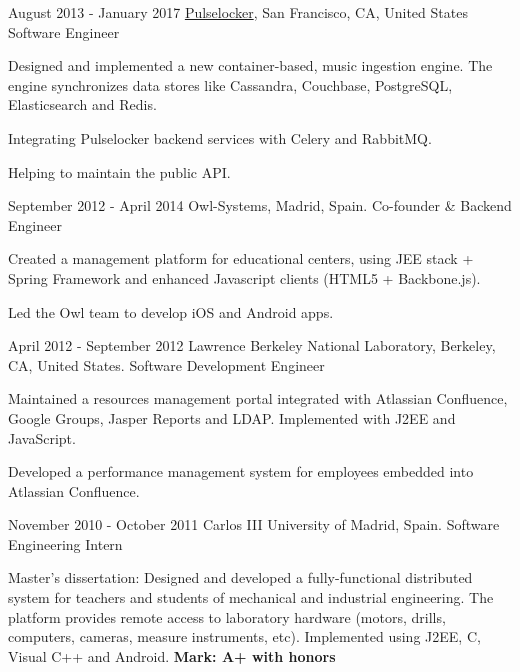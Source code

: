 \experience
  {August 2013 - January 2017}
  {\href{https://djtechtools.com/2018/04/04/beatport-acquires-pulselocker-relaunching-subscription-service-in-q3-2018/}{Pulselocker}, San Francisco, CA, United States}
  {Software Engineer}
  {\vspace{-1em}\begin{rlist}
    \item Designed and implemented a new container-based, music ingestion engine. The engine
    synchronizes data stores like Cassandra, Couchbase, PostgreSQL, Elasticsearch and Redis.
    \item Integrating Pulselocker backend services with Celery and RabbitMQ.
    \item Helping to maintain the public API.
  \end{rlist}}

\experience
  {September 2012 - April 2014}
  {Owl-Systems, Madrid, Spain.}
  {Co-founder \& Backend Engineer}
  {\vspace{-1em}\begin{rlist}
    \item Created a management platform for educational centers, using JEE stack + Spring
    Framework and enhanced Javascript clients (HTML5 + Backbone.js).
    \item Led the Owl team to develop iOS and Android apps.
  \end{rlist}}

\experience
  {April 2012 - September 2012}
  {Lawrence Berkeley National Laboratory, Berkeley, CA, United States.}
  {Software Development Engineer}
  {\vspace{-1em}\begin{rlist}
    \item Maintained a resources management portal integrated with Atlassian Confluence,
    Google Groups, Jasper Reports and LDAP. Implemented with J2EE and JavaScript.
    \item Developed a performance management system for employees embedded into Atlassian Confluence.
  \end{rlist}}

\experience
  {November 2010 - October 2011}
  {Carlos III University of Madrid, Spain.}
  {Software Engineering Intern}
  {\vspace{-1em}\begin{rlist}
    \item Master's dissertation: Designed and developed a fully-functional distributed system
    for teachers and students of mechanical and industrial engineering. The platform provides
    remote access to laboratory hardware (motors, drills, computers, cameras, measure
    instruments, etc). Implemented using J2EE, C, Visual C++ and Android.
    \textbf{Mark: A+ with honors}
  \end{rlist}}


